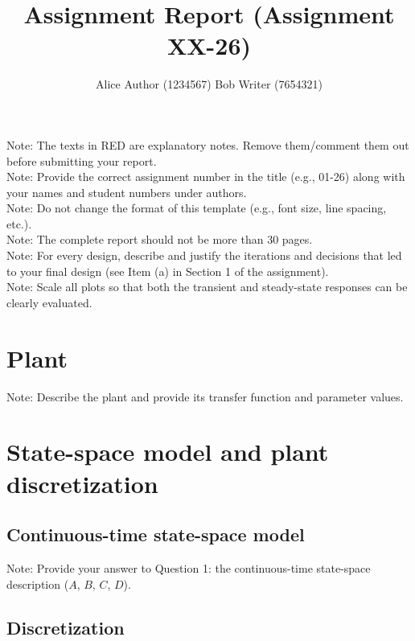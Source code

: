 \documentclass{article}
\date{}
\title{Assignment Report (Assignment XX-26)}
\author{%
Alice Author (1234567) \quad
Bob Writer (7654321)
}
\begin{document}
\maketitle

{\color{red}Note: The texts in RED are explanatory notes. Remove them/comment them out before submitting your report.}\\
{\color{red}Note: Provide the correct assignment number in the title (e.g., 01-26) along with your names and student numbers under authors.}\\
{\color{red}Note: Do not change the format of this template (e.g., font size, line spacing, etc.).}\\
{\color{red}Note: The complete report should not be more than 30 pages.}\\
{\color{red}Note: For every design, describe and justify the iterations and decisions that led to your final design (see Item (a) in Section 1 of the assignment).}\\
{\color{red}Note: Scale all plots so that both the transient and steady-state responses can be clearly evaluated.}\\

\section*{Plant}

{\color{red}Note: Describe the plant and provide its transfer function and parameter values.}


\section{State-space model and plant discretization}

\subsection{Continuous-time state-space model}

{\color{red}Note: Provide your answer to Question 1: the continuous-time state-space description ($A$, $B$, $C$, $D$).}

\subsection{Discretization}
\end{document}
